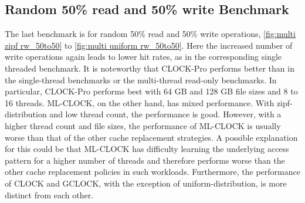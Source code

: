 \documentclass[
	12pt,
	a4paper,
	abstract,
	bibliography=totoc,
	chapterprefix,
	headings=openright,
	numbers=endperiod,
	parskip=half,
	twoside,
]{scrreprt}
\begin{document}
\newpage
\subsection{Random 50\% read and 50\% write Benchmark}

The last benchmark is for random 50\% read and 50\% write operations, \cref{fig:multi zipf rw_50to50} to 
\cref{fig:multi uniform rw_50to50}.
Here the increased number of write operations again leads to lower hit rates, 
as in the corresponding single threaded benchmark.
It is noteworthy that CLOCK-Pro performs better than in the single-thread 
benchmarks or the multi-thread read-only benchmarks.
In particular, CLOCK-Pro performs best with 64 GB and 128 GB 
file sizes and 8 to 16 threads.
ML-CLOCK, on the other hand, has mixed performance.
With zipf-distribution and low thread count, the performance is good.
However, with a higher thread count and file sizes, the performance of ML-CLOCK 
is usually worse than that of the other cache replacement strategies.
A possible explanation for this could be that ML-CLOCK has difficulty learning the 
underlying access pattern for a higher number of threads and 
therefore performs worse than the other cache replacement policies in such workloads.
Furthermore, the performance of CLOCK and GCLOCK, with the exception of uniform-distribution, 
is more distinct from each other.
\end{document}
